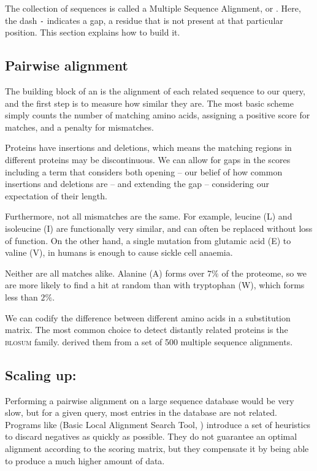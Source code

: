 The collection of sequences is called a Multiple Sequence Alignment, or \MSA.
Here, the dash \texttt{-} indicates a gap, a residue that is not present at that particular position.
This section explains how to build it.


\subsection{Pairwise alignment}
The building block of an \MSA{} is the alignment of each related sequence to our query, and the first step is to measure how similar they are.
The most basic scheme simply counts the number of matching amino acids, assigning a positive score for matches, and a penalty for mismatches. 

Proteins have insertions and deletions, which means the matching regions in different proteins may be discontinuous.  
We can allow for gaps in the scores including a term that considers both opening -- our belief of how common insertions and deletions are -- and extending the gap -- considering our expectation of their length.

Furthermore, not all mismatches are the same.
For example, leucine (L) and isoleucine (I) are functionally very similar, and can often be replaced without loss of function.
On the other hand, a single mutation from glutamic acid (E) to valine (V), in humans is enough to cause sickle cell anaemia.

Neither are all matches alike.
Alanine (A) forms over $7\%$ of the proteome, so we are more likely to find a hit at random than with tryptophan (W), which forms less than $2\%$.

We can codify the difference between different amino acids in a substitution matrix. 
The most common choice to detect distantly related proteins is the \textsc{blosum} family.
\citet{blosum} derived them from a set of 500 multiple sequence alignments.

\subsection{Scaling up: \BLAST}
Performing a pairwise alignment on a large sequence database would be very slow, but for a given query, most entries in the database are not related.
Programs like \BLAST{} (Basic Local Alignment Search Tool, \citep{blast}) introduce a set of heuristics to discard negatives as quickly as possible.
They do not guarantee an optimal alignment according to the scoring matrix, but they compensate it by being able to produce a much higher amount of data.

